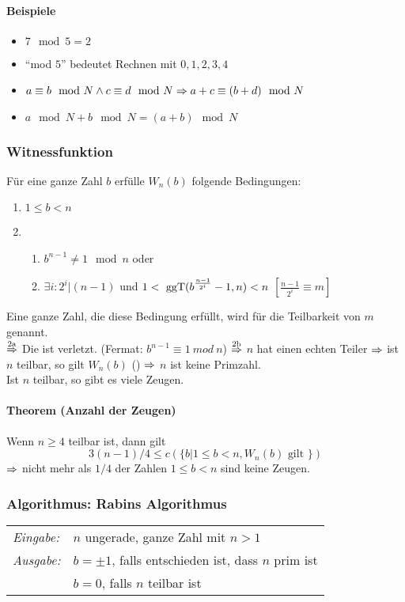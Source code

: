 \documentclass[a4paper,twoside,DIV15,BCOR12mm]{scrbook}
\begin{document}
\paragraph{Beispiele}
\begin{itemize}
	\item $7 \mod 5 = 2$
	\item "`mod $5$"' bedeutet Rechnen mit $0,1,2,3,4$
	\item $a \equiv b \mod N \wedge c \equiv d \mod N \Rightarrow a+c \equiv (b+d) \mod N$
	\item $a \mod N + b \mod N = (a+b) \mod N$
\end{itemize}

\subsubsection{Witnessfunktion}
Für eine ganze Zahl $b$ erfülle $W_n(b)$ folgende Bedingungen:
\begin{enumerate}
	\item $1 \le b < n$
	\item 
		\begin{enumerate}
			\item $b^{n-1} \neq 1 \mod n$ oder
			\item $\exists i:2^i|(n-1)$ und $1<\text{ ggT}(b^{\frac{n-1}{2^i}}-1,n)<n$ $\left[\frac{n-1}{2^i}\equiv m\right]$
		\end{enumerate}
	\end{enumerate}
Eine ganze Zahl, die diese Bedingung erfüllt, wird  für die Teilbarkeit von $m$ genannt.\\
$\stackrel{\text{2a}}{\Rightarrow}$ Die  ist verletzt. (Fermat: $b^{n-1}\equiv1\ mod\ n$)
$\stackrel{\text{2b}}{\Rightarrow}$ $n$ hat einen echten Teiler 
$\Rightarrow$ ist $n$ teilbar, so gilt $W_n(b)$ ()
$\Rightarrow$ $n$ ist keine Primzahl.\\
Ist $n$ teilbar, so gibt es viele Zeugen.

\paragraph{Theorem (Anzahl der Zeugen)}
Wenn $n \ge 4$ teilbar ist, dann gilt
$${3(n-1)}/4 \le c(\{b|1\le b<n, W_n(b) \text{ gilt }\})$$
$\Rightarrow$ nicht mehr als $1/4$ der Zahlen $1 \le b <n$ sind keine Zeugen.\\

\subsubsection{Algorithmus: Rabins Algorithmus}
\begin{tabular}{ll}
	\emph{Eingabe:} & $n$ ungerade, ganze Zahl mit $n>1$ \\
	\emph{Ausgabe:} & $b=\pm 1$, falls entschieden ist, dass $n$ prim ist\\
	                & $b=0$, falls $n$ teilbar ist\\
\end{tabular}\bigskip
\end{document}
